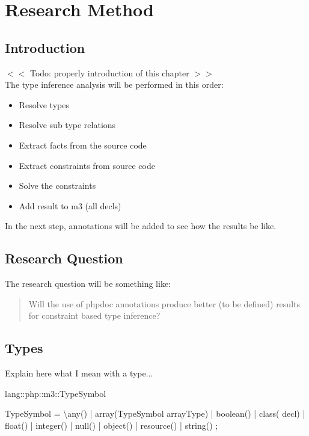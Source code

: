 \documentclass[../main.tex]{subfiles}
\begin{document}
    \chapter{Research Method}\label{chap:research_method}


    \section{Introduction}
    $<<$ Todo: properly introduction of this chapter $>>$
    \\
    The type inference analysis will be performed in this order:
    \begin{itemize}
        \item Resolve types
        \item Resolve sub type relations
        \item Extract facts from the source code
        \item Extract constraints from source code
        \item Solve the constraints
        \item Add result to m3 (all decls)
    \end{itemize}
    In the next step, annotations will be added to see how the results be like.
    
    \section{Research Question}
    The research question will be something like: \\
    \begin{quote}
        Will the use of phpdoc annotations produce better (to be defined) results for constraint based type inference?
    \end{quote}

    \section{Types}
    Explain here what I mean with a type...
    
    \begin{rascal}
 lang::php::m3::TypeSymbol

 TypeSymbol
  = \textbackslash{}any()        | array(TypeSymbol arrayType)
  | boolean()     | class( decl)
  | float()       | integer()
  | null()        | object()
  | resource()    | string()
  ;
    \end{rascal}
    
\end{document}
